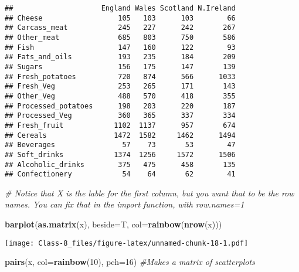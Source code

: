 \documentclass[]{article}
\newenvironment{Shaded}{\begin{snugshade}}{\end{snugshade}}
\newcommand{\CommentTok}[1]{\textcolor[rgb]{0.56,0.35,0.01}{\textit{#1}}}
\newcommand{\DataTypeTok}[1]{\textcolor[rgb]{0.13,0.29,0.53}{#1}}
\newcommand{\DecValTok}[1]{\textcolor[rgb]{0.00,0.00,0.81}{#1}}
\newcommand{\KeywordTok}[1]{\textcolor[rgb]{0.13,0.29,0.53}{\textbf{#1}}}
\newcommand{\NormalTok}[1]{#1}
\begin{document}
\begin{verbatim}
##                     England Wales Scotland N.Ireland
## Cheese                  105   103      103        66
## Carcass_meat            245   227      242       267
## Other_meat              685   803      750       586
## Fish                    147   160      122        93
## Fats_and_oils           193   235      184       209
## Sugars                  156   175      147       139
## Fresh_potatoes          720   874      566      1033
## Fresh_Veg               253   265      171       143
## Other_Veg               488   570      418       355
## Processed_potatoes      198   203      220       187
## Processed_Veg           360   365      337       334
## Fresh_fruit            1102  1137      957       674
## Cereals                1472  1582     1462      1494
## Beverages                57    73       53        47
## Soft_drinks            1374  1256     1572      1506
## Alcoholic_drinks        375   475      458       135
## Confectionery            54    64       62        41
\end{verbatim}

\begin{Shaded}
\begin{Highlighting}[]
\CommentTok{# Notice that X is the lable for the first column, but you want that to be the row names. You can fix that in the import function, with row.names=1}
\end{Highlighting}
\end{Shaded}

\begin{Shaded}
\begin{Highlighting}[]
\KeywordTok{barplot}\NormalTok{(}\KeywordTok{as.matrix}\NormalTok{(x), }\DataTypeTok{beside=}\NormalTok{T, }\DataTypeTok{col=}\KeywordTok{rainbow}\NormalTok{(}\KeywordTok{nrow}\NormalTok{(x)))}
\end{Highlighting}
\end{Shaded}

\texttt{[image: Class-8\_files/figure-latex/unnamed-chunk-18-1.pdf]}

\begin{Shaded}
\begin{Highlighting}[]
\KeywordTok{pairs}\NormalTok{(x, }\DataTypeTok{col=}\KeywordTok{rainbow}\NormalTok{(}\DecValTok{10}\NormalTok{), }\DataTypeTok{pch=}\DecValTok{16}\NormalTok{)  }\CommentTok{#Makes a matrix of scatterplots}
\end{Highlighting}
\end{Shaded}
\end{document}
